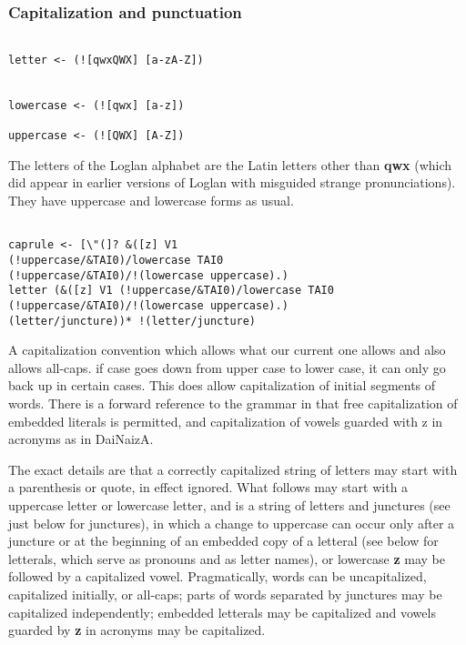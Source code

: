 \documentclass{article}
\begin{document}
\subsubsection{Capitalization and punctuation}

\begin{verbatim}

letter <- (![qwxQWX] [a-zA-Z])


lowercase <- (![qwx] [a-z])

uppercase <- (![QWX] [A-Z])

\end{verbatim}

The letters of the Loglan alphabet are the Latin letters other than {\bf qwx} (which did appear in earlier versions of Loglan with misguided strange pronunciations).  They have uppercase and lowercase forms as usual.

\begin{verbatim}

caprule <- [\"(]? &([z] V1 
(!uppercase/&TAI0)/lowercase TAI0 
(!uppercase/&TAI0)/!(lowercase uppercase).) 
letter (&([z] V1 (!uppercase/&TAI0)/lowercase TAI0 
(!uppercase/&TAI0)/!(lowercase uppercase).) 
(letter/juncture))* !(letter/juncture)

\end{verbatim}

A capitalization convention which allows what our current one allows and also allows all-caps.
if case goes down from upper case to lower case, it can only go back up in certain cases.  This
does allow capitalization of initial segments of words.  There is a forward reference to the grammar
in that free capitalization of embedded literals is permitted, and capitalization of vowels
guarded with z in acronyms as in DaiNaizA.

The exact details are that a correctly capitalized string of letters may start with a parenthesis or quote, in effect ignored.
What follows may start with a uppercase letter or lowercase letter, and is a string of letters and junctures (see just below for junctures),
in which a change to uppercase can occur only after a juncture or at the beginning of an embedded copy of a letteral (see below for letterals, which serve as pronouns and as letter names), or lowercase {\bf z} may be followed by a capitalized vowel.  Pragmatically, words can be uncapitalized, capitalized initially, or all-caps;  parts of words separated by junctures may be capitalized independently;  embedded letterals may be capitalized and vowels guarded by {\bf z} in acronyms may be capitalized.
\end{document}
